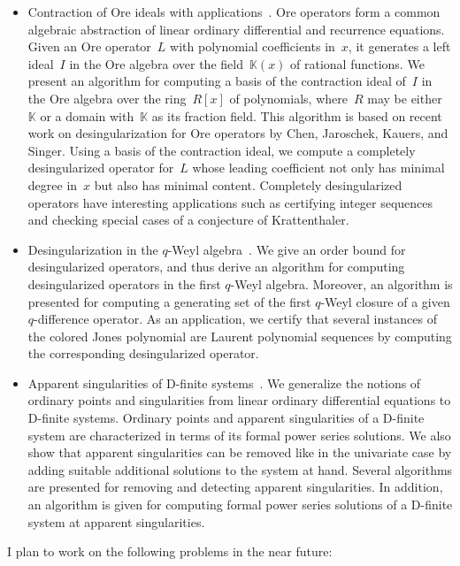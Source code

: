 \documentclass[10pt,a4paper]{article}
\newcommand{\bK}{ {\mathbb  K}}
\begin{document}
\begin{itemize}
\item Contraction of Ore ideals with applications~\cite{Zhang2016}. Ore operators form a common algebraic abstraction of linear ordinary differential and recurrence equations.
Given an Ore operator~$L$ with polynomial coefficients in~$x$, it generates a left ideal~$I$ in the Ore algebra
over the field~$\bK(x)$ of rational functions. We present an algorithm for computing a basis of the contraction ideal of~$I$
in the Ore algebra over the ring~$R[x]$ of polynomials, where~$R$ may be either~$\bK$ or a domain with~$\bK$ as its fraction field.
This algorithm is based on recent work on desingularization for Ore operators by Chen, Jaroschek, Kauers, and Singer.
Using a basis of the contraction ideal,
we compute a completely desingularized operator for~$L$ whose leading coefficient not only
has minimal degree in~$x$ but also has minimal content. Completely desingularized operators have interesting applications
such as certifying integer sequences and checking special cases of a conjecture of Krattenthaler.

\item Desingularization in the $q$-Weyl algebra~\cite{KZ2018}. 
We give an order bound for desingularized operators, and thus derive
an algorithm for computing desingularized operators in the first $q$-Weyl
algebra.  Moreover, an algorithm is presented for computing a generating set
of the first $q$-Weyl closure of a given $q$-difference operator.  As an
application, we certify that several instances of the colored Jones polynomial
are Laurent polynomial sequences by computing the corresponding desingularized
operator.

\item Apparent singularities of D-finite systems~\cite{Yi2017}. We generalize the notions of  ordinary points and singularities
from linear ordinary differential equations to D-finite systems.
Ordinary points and apparent singularities of a D-finite system are characterized in terms of its formal power series solutions.
We also show that apparent singularities can be removed like in the univariate
case by adding suitable additional solutions to the system at hand.
Several algorithms are presented for removing and detecting apparent singularities.
In addition,  an algorithm is given for computing formal power series solutions of a D-finite system
at apparent singularities.
\end{itemize}

I plan to work on the following problems in the near future:
\end{document}
